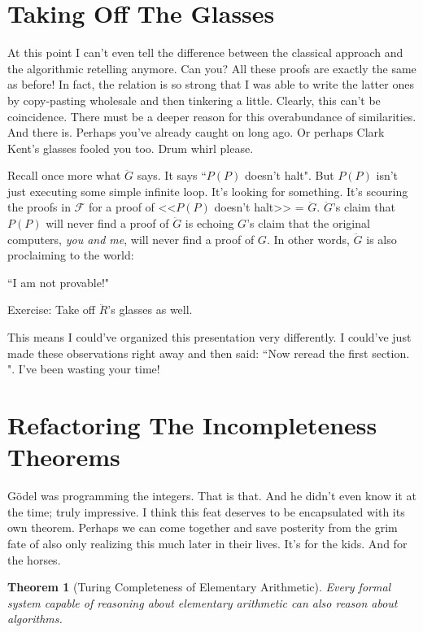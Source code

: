 \documentclass{article}
\theoremstyle{theorem}
\newtheorem{theorem}{Theorem}
\begin{document}
\section{Taking Off The Glasses}

At this point I can't even tell the difference between the classical approach and the algorithmic retelling anymore. Can you? All these proofs are exactly the same as before! In fact, the relation is so strong that I was able to write the latter ones by copy-pasting wholesale and then tinkering a little. Clearly, this can't be coincidence. There must be a deeper reason for this overabundance of similarities. And there is. Perhaps you've already caught on long ago. Or perhaps Clark Kent's glasses fooled you too. Drum whirl please.

Recall once more what $\ddot{G}$ says. It says ``$P(P)$ doesn't halt". But $P(P)$ isn't just executing some simple infinite loop. It's looking for something. It's scouring the proofs in $\mathcal{F}$ for a proof of <<$P(P)$ doesn't halt>> = $\ddot{G}$. $\ddot{G}$'s claim that $P(P)$ will never find a proof of $\ddot{G}$ is echoing $G$'s claim that the original computers, \textit{you and me}, will never find a proof of $G$. In other words, $\ddot{G}$ is also proclaiming to the world:
\begin{center}
``I am not provable!"
\end{center}
Exercise: Take off $\ddot{R}$'s glasses as well.

This means I could've organized this presentation very differently. I could've just made these observations right away and then said: ``Now reread the first section. \scalebox{0.9}{$\square$}". I've been wasting your time!

\section{Refactoring The Incompleteness Theorems}

Gödel was programming the integers. That is that. And he didn't even know it at the time; truly impressive. I think this feat deserves to be encapsulated with its own theorem. Perhaps we can come together and save posterity from the grim fate of also only realizing this much later in their lives. It's for the kids. And for the horses.

\begin{theorem}[Turing Completeness of Elementary Arithmetic]
Every formal system capable of reasoning about elementary arithmetic can also reason about algorithms.
\end{theorem}
\end{document}
